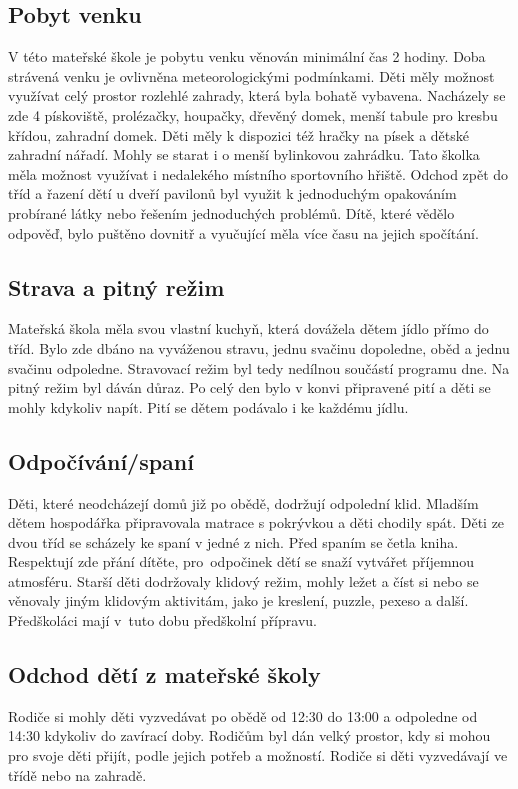 		\subsection{Pobyt venku}
			V této mateřské škole je pobytu venku věnován minimální čas 2 hodiny. Doba strávená venku je ovlivněna meteorologickými podmínkami. Děti měly možnost využívat celý prostor rozlehlé zahrady, která byla bohatě vybavena. Nacházely se zde 4 pískoviště, prolézačky, houpačky, dřevěný domek, menší tabule pro kresbu křídou, zahradní domek. Děti měly k dispozici též hračky na písek a dětské zahradní nářadí. Mohly se starat i o menší bylinkovou zahrádku. Tato školka měla možnost využívat i nedalekého místního sportovního hřiště. Odchod zpět do tříd a řazení dětí u dveří pavilonů byl využit k jednoduchým opakováním probírané látky nebo řešením jednoduchých problémů. Dítě, které vědělo odpověď, bylo puštěno dovnitř a vyučující měla více času na jejich spočítání.

		\subsection{Strava a pitný režim}
			Mateřská škola měla svou vlastní kuchyň, která dovážela dětem jídlo přímo do tříd. Bylo zde dbáno na vyváženou stravu, jednu svačinu dopoledne, oběd a jednu svačinu odpoledne. Stravovací režim byl tedy nedílnou součástí programu dne. Na pitný režim byl dáván důraz. Po celý den bylo v konvi připravené pití a děti se mohly kdykoliv napít. Pití se dětem podávalo i ke každému jídlu.

		\subsection{Odpočívání/spaní}
			Děti, které neodcházejí domů již po obědě, dodržují odpolední klid. Mladším dětem hospodářka připravovala matrace s pokrývkou a děti chodily spát. Děti ze dvou tříd se scházely ke spaní v jedné z nich. Před spaním se četla kniha. Respektují zde přání dítěte, pro odpočinek dětí se snaží vytvářet příjemnou atmosféru. Starší děti dodržovaly klidový režim, mohly ležet a číst si nebo se věnovaly jiným klidovým aktivitám, jako je kreslení, puzzle, pexeso a další.  Předškoláci mají v tuto dobu předškolní přípravu. 


		\subsection{Odchod dětí z mateřské školy}
			Rodiče si mohly děti vyzvedávat po obědě od 12:30 do 13:00 a odpoledne od 14:30 kdykoliv do zavírací doby. Rodičům byl dán velký prostor, kdy si mohou pro svoje děti přijít, podle jejich potřeb a možností. Rodiče si děti vyzvedávají ve třídě nebo na zahradě. 

